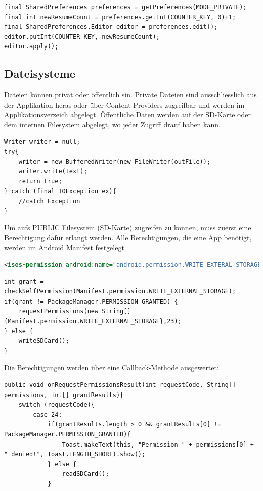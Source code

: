 \documentclass[a4paper, 11pt]{article}
\begin{document}
\begin{lstlisting}[caption={Holen des ResumeCount und um eins erhöht wieder abspeichern}]
final SharedPreferences preferences = getPreferences(MODE_PRIVATE);
final int newResumeCount = preferences.getInt(COUNTER_KEY, 0)+1;
final SharedPreferences.Editor editor = preferences.edit();
editor.putInt(COUNTER_KEY, newResumeCount);
editor.apply();
\end{lstlisting}

\subsection{Dateisysteme}
Dateien können privat oder öffentlich sin. Private Dateien sind ausschliesslich aus der Applikation heras oder über Content Providers zugreifbar und werden im Applikationsverzeich abgelegt. Öffentliche Daten werden auf der SD-Karte oder dem internen Filesystem abgelegt, wo jeder Zugriff drauf haben kann.

\begin{lstlisting}[caption={File schreiben}]
Writer writer = null;
try{
	writer = new BufferedWriter(new FileWriter(outFile));
	writer.write(text);
	return true;
} catch (final IOException ex){
	//catch Exception
}
\end{lstlisting}

Um aufs PUBLIC Filesystem (SD-Karte) zugreifen zu können, muss zuerst eine Berechtigung dafür erlangt werden. Alle Berechtigungen, die eine App benötigt, werden im Android Manifest festgelegt

\begin{lstlisting}[language=xml, caption={Berechtigung im Android Manifest für das Lesen vond der SD-Karte}]
<ises-permission android:name="android.permission.WRITE_EXTERAL_STORAGE"/>
\end{lstlisting}

\begin{lstlisting}[caption={Checken, ob man die Berechtigung hat und wenn nicht, Berechitung anfragen}]
int grant = checkSelfPermission(Manifest.permission.WRITE_EXTERNAL_STORAGE);
if(grant != PackageManager.PERMISSION_GRANTED) {
	requestPermissions(new String[]{Manifest.permission.WRITE_EXTERNAL_STORAGE},23);
} else {
	writeSDCard();
}
\end{lstlisting}

Die Berechtigungen werden über eine Callback-Methode ausgewertet:

\begin{lstlisting}[caption={Verarbeitung der Permission-Grants}]
public void onRequestPermissionsResult(int requestCode, String[] permissions, int[] grantResults){
	switch (requestCode){
		case 24:
			if(grantResults.length > 0 && grantResults[0] != PackageManager.PERMISSION_GRANTED){
				Toast.makeText(this, "Permission " + permissions[0] + " denied!", Toast.LENGTH_SHORT).show();
			} else {
				readSDCard();
			}
\end{lstlisting}
\end{document}
